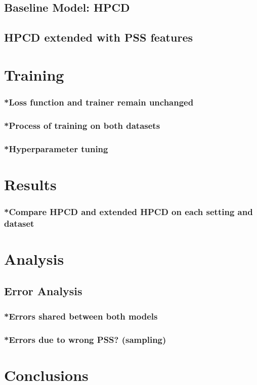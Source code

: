 \subsection{Baseline Model: HPCD}
\subsection{HPCD extended with PSS features}

\section{Training}
\subsubsection{*Loss function and trainer remain unchanged}
\subsubsection{*Process of training on both datasets}
\subsubsection{*Hyperparameter tuning}

\section{Results}
\subsubsection{*Compare HPCD and extended HPCD on each setting and dataset}

\section{Analysis}
\subsection{Error Analysis}
\subsubsection{*Errors shared between both models}
\subsubsection{*Errors due to wrong PSS? (sampling)}

\section{Conclusions}
